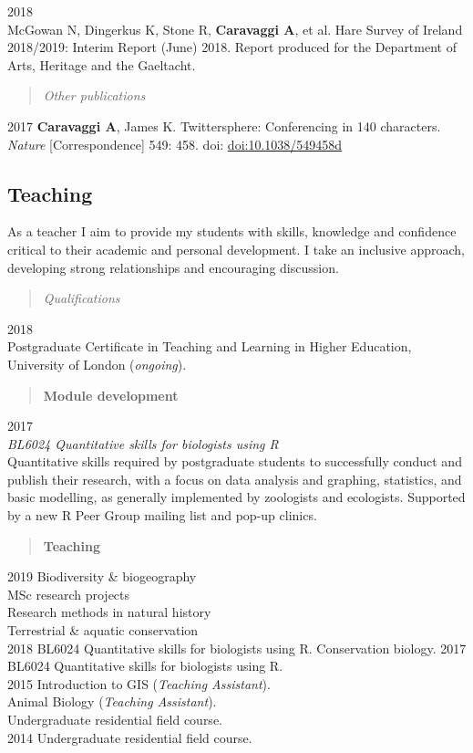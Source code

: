 \documentclass[]{article}
\begin{document}
2018\\
McGowan N, Dingerkus K, Stone R, \textbf{Caravaggi A}, et al. Hare
Survey of Ireland 2018/2019: Interim Report (June) 2018. Report produced
for the Department of Arts, Heritage and the Gaeltacht.

\begin{quote}
\emph{Other publications}
\end{quote}

2017 \textbf{Caravaggi A}, James K. Twittersphere: Conferencing in 140
characters. \emph{Nature} {[}Correspondence{]} 549: 458. doi:
\href{http://www.nature.com/nature/journal/v549/n7673/full/549458d.html}{doi:10.1038/549458d}

\subsection{Teaching}\label{teaching}

As a teacher I aim to provide my students with skills, knowledge and
confidence critical to their academic and personal development. I take
an inclusive approach, developing strong relationships and encouraging
discussion.

\begin{quote}
\emph{Qualifications}
\end{quote}

2018\\
Postgraduate Certificate in Teaching and Learning in Higher Education,
University of London (\emph{ongoing}).

\begin{quote}
\textbf{Module development}
\end{quote}

2017\\
\emph{BL6024 Quantitative skills for biologists using R}\\
Quantitative skills required by postgraduate students to successfully
conduct and publish their research, with a focus on data analysis and
graphing, statistics, and basic modelling, as generally implemented by
zoologists and ecologists. Supported by a new R Peer Group mailing list
and pop-up clinics.

\begin{quote}
\textbf{Teaching}
\end{quote}

2019 Biodiversity \& biogeography\\
MSc research projects\\
Research methods in natural history\\
Terrestrial \& aquatic conservation\\
2018 BL6024 Quantitative skills for biologists using R. Conservation
biology. 2017 BL6024 Quantitative skills for biologists using R.\\
2015 Introduction to GIS (\emph{Teaching Assistant}).\\
Animal Biology (\emph{Teaching Assistant}).\\
Undergraduate residential field course.\\
2014 Undergraduate residential field course.
\end{document}

